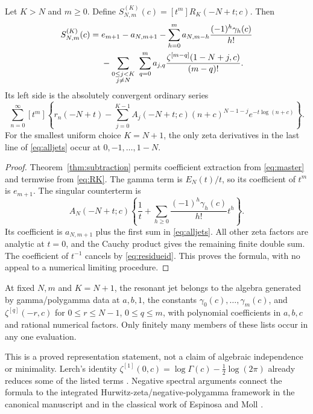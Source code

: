 \begin{theorem}\label{thm:jets}
Let $K>N$ and $m\ge0$.  Define
$S_{N,m}^{(K)}(c)=[t^m]R_K(-N+t;c)$.  Then
\begin{align}
 S_{N,m}^{(K)}(c)={}&e_{m+1}-a_{N,m+1}
 -\sum_{h=0}^m a_{N,m-h}\frac{(-1)^h\gamma_h(c)}{h!}
 \notag\\
 &-\sum_{\substack{0\le j<K\\j\ne N}}\ 
   \sum_{q=0}^m a_{j,q}
      \frac{\zeta^{[m-q]}(1-N+j,c)}{(m-q)!}.
 \label{eq:alljets}
\end{align}
Its left side is the absolutely convergent ordinary series
\begin{equation}\label{eq:jetseries}
 \sum_{n=0}^\infty [t^m]\left\{
 r_n(-N+t)-\sum_{j=0}^{K-1}
 A_j(-N+t;c)(n+c)^{N-1-j}e^{-t\log(n+c)}\right\}.
\end{equation}
For the smallest uniform choice $K=N+1$, the only zeta derivatives in the
last line of \eqref{eq:alljets} occur at $0,-1,\ldots,1-N$.
\end{theorem}
\begin{proof}
Theorem~\ref{thm:subtraction} permits coefficient extraction from
\eqref{eq:master} and termwise from \eqref{eq:RK}.
The gamma term is $E_N(t)/t$, so its coefficient of $t^m$ is $e_{m+1}$.
The singular counterterm is
\[
 A_N(-N+t;c)\left\{\frac1t+
 \sum_{h\ge0}\frac{(-1)^h\gamma_h(c)}{h!}t^h\right\}.
\]
Its coefficient is $a_{N,m+1}$ plus the first sum in
\eqref{eq:alljets}.  All other zeta factors are analytic at $t=0$, and the
Cauchy product gives the remaining finite double sum.
The coefficient of $t^{-1}$ cancels by \eqref{eq:residueid}.
This proves the formula, with no appeal to a numerical limiting procedure.
\end{proof}

\begin{corollary}\label{cor:closure}
At fixed $N,m$ and $K=N+1$, the resonant jet belongs to the algebra generated
by gamma/polygamma data at $a,b,1$, the constants
$\gamma_0(c),\ldots,\gamma_m(c)$, and
$\zeta^{[q]}(-r,c)$ for $0\le r\le N-1$, $0\le q\le m$,
with polynomial coefficients in $a,b,c$ and rational numerical factors.
Only finitely many members of these lists occur in any one evaluation.
\end{corollary}
This is a proved representation statement, not a claim of algebraic
independence or minimality.  Lerch's identity
$\zeta^{[1]}(0,c)=\log\Gamma(c)-\tfrac12\log(2\pi)$ already reduces
some of the listed terms \cite[25.11.18]{dlmf-hurwitz}.
Negative spectral arguments connect the formula to the integrated
Hurwitz-zeta/negative-polygamma framework in the canonical manuscript and
in the classical work of Espinosa and Moll \cite{espinosa-moll}.

